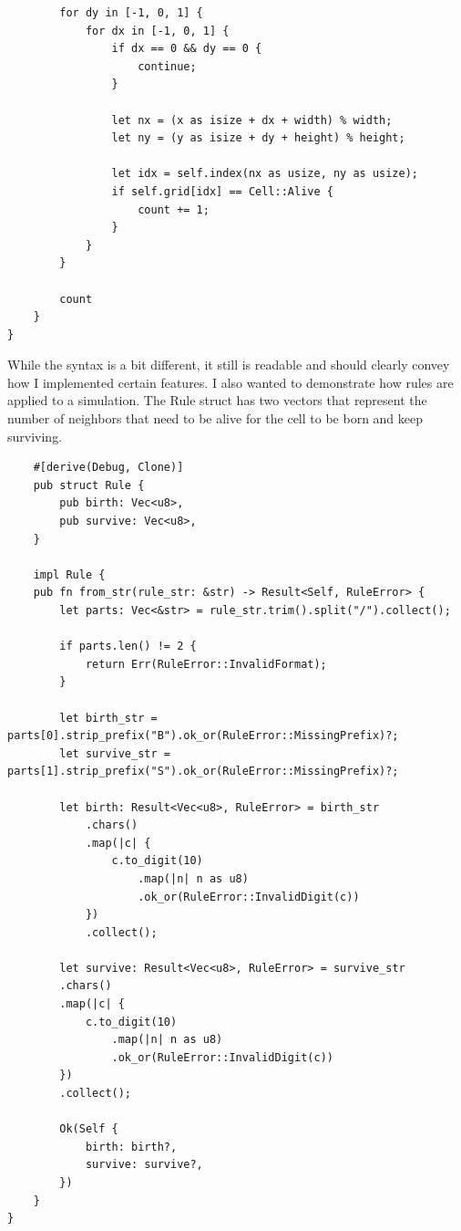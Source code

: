 \documentclass[12pt]{article}
\begin{document}
\begin{singlespace}
\begin{verbatim}
        for dy in [-1, 0, 1] {
            for dx in [-1, 0, 1] {
                if dx == 0 && dy == 0 {
                    continue;
                }

                let nx = (x as isize + dx + width) % width;
                let ny = (y as isize + dy + height) % height;

                let idx = self.index(nx as usize, ny as usize);
                if self.grid[idx] == Cell::Alive {
                    count += 1;
                }
            }
        }

        count
    }
}
\end{verbatim}

\end{singlespace}
While the syntax is a bit different, it still is readable and should clearly convey how
I implemented certain features. I also wanted to demonstrate how rules are applied to a simulation.
The Rule struct has two vectors that represent the number of neighbors that need to be alive
for the cell to be born and keep surviving.
\begin{singlespace}

	\begin{verbatim}
    #[derive(Debug, Clone)]
    pub struct Rule {
        pub birth: Vec<u8>,
        pub survive: Vec<u8>,
    }
    
    impl Rule {
    pub fn from_str(rule_str: &str) -> Result<Self, RuleError> {
        let parts: Vec<&str> = rule_str.trim().split("/").collect();

        if parts.len() != 2 {
            return Err(RuleError::InvalidFormat);
        }

        let birth_str = parts[0].strip_prefix("B").ok_or(RuleError::MissingPrefix)?;
        let survive_str = parts[1].strip_prefix("S").ok_or(RuleError::MissingPrefix)?;

        let birth: Result<Vec<u8>, RuleError> = birth_str
            .chars()
            .map(|c| {
                c.to_digit(10)
                    .map(|n| n as u8)
                    .ok_or(RuleError::InvalidDigit(c))
            })
            .collect();

        let survive: Result<Vec<u8>, RuleError> = survive_str
        .chars()
        .map(|c| {
            c.to_digit(10)
                .map(|n| n as u8)
                .ok_or(RuleError::InvalidDigit(c))
        })
        .collect();

        Ok(Self {
            birth: birth?,
            survive: survive?,
        })
    }
}
\end{verbatim}
\end{singlespace}
\end{document}
